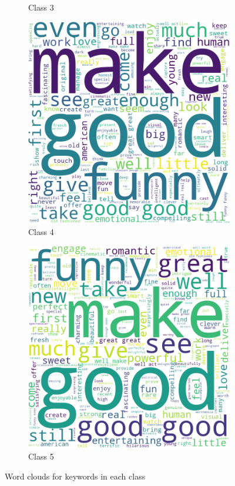 \documentclass[10pt, a4paper]{article}
\begin{document}
\begin{figure}[h]
\begin{subfigure}[b]{0.18\textwidth}
         \caption{Class 3}
         \label{fig:class3cloud}
     \end{subfigure}
     \hfill
     \begin{subfigure}[b]{0.18\textwidth}
         \centering
         \includegraphics[width=\textwidth]{keywords4.png}
         \caption{Class 4}
         \label{fig:class4cloud}
     \end{subfigure}
     \hfill
     \begin{subfigure}[b]{0.18\textwidth}
         \centering
         \includegraphics[width=\textwidth]{keywords5.png}
         \caption{Class 5}
         \label{fig:class5cloud}
     \end{subfigure}
     \hfill
    \caption{Word clouds for keywords in each class}
\label{fig:classcloud}
\end{figure}
\end{document}
